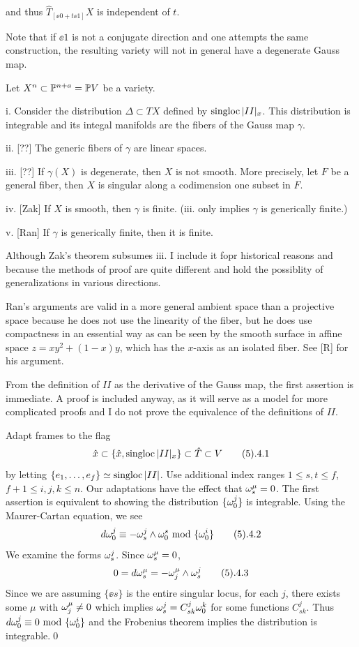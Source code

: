 and thus $\hat T_{[\ee 0 + t\ee 1]}X$ is independent of $t$.

Note that if $\ee 1$ is not a conjugate direction and one attempts
the same construction, the resulting variety will not in general
have a degenerate Gauss map.
 
 
Let $X^n\subset\Bbb P^{n+a}=\Bbb P V$ be a
variety.


i. Consider the distribution 
$\Delta\subset TX$ defined by $\text{singloc}\,| II |_x$.
This distribution is integrable and its integal manifolds
are the fibers of the Gauss map $\gamma$. 

ii. [??] The generic fibers of $\gamma$ are linear spaces.
 
iii. 
[??]
If $\gamma (X)$ is degenerate, then
$X$ is not smooth. More precisely, let $F$ be a general fiber,
then $X$ is singular along a codimension one subset in $F$.

iv. [Zak] If $X$ is smooth, then $\gamma$ is finite.
(iii. only implies $\gamma$ is generically finite.)

 
v. [Ran] If $\gamma$ is generically finite, then it is finite.
\endproclaim

Although Zak's theorem subsumes iii.   I include it
fopr historical reasons and 
  because the methods of proof are quite different and hold
the possiblity of generalizations in various directions.

 
Ran's arguments are valid in a more general ambient space
than a projective space because he
does not use the linearity of the fiber, but he does
use compactness in an essential way as can be seen by
the  smooth surface in affine space $z= xy^2+ (1-x)y$,
which has the $x$-axis as an isolated fiber.
See [R] for his argument.
$$
\ 
$$


 

 From the definition of $II$ as the derivative of the 
Gauss map, the first   assertion is   immediate. A proof
is included anyway, as it  will serve as a model
for more complicated proofs and I do not prove the equivalence of the
definitions of $II$.

Adapt frames   to the flag
$$
\hat x\subset \{ \hat x , \tsingloc
\ii_x\}\subset\hat T\subset V \tag 5.4.1
$$
by letting $\{e_{1}, \hdots ,e_{f}\}\simeq \text{singloc}\,| II |$.
Use additional index ranges $1\leq s,t\leq f$,
$f+1\leq i,j,k\leq n$.
Our adaptations have the effect that $\omega^{\mu}_{s}=0$.
The first assertion is equivalent to showing the distribution
$\{\omega^{j}_0\}$ is integrable. Using the Maurer-Cartan equation,
we see 
$$
d\oo j\equiv -\ooo js\ww\oo s \tmod \{\oo i\} \tag 5.4.2
$$
We   examine the forms $\omega^{j}_{s}$. Since $\omega^{\mu}_{s}=0$,
$$
0=d\ooo\mu s = -\ooo\mu j\ww\ooo js\tag 5.4.3
$$
Since we are assuming $\{\ee s\}$ is the entire singular locus,
for each $j$, there exists some $\mu$ with $\omega^{\mu}_{j}\neq 0$
which implies
  $\omega^{j}_{s} = C^j_{sk}\omega^{k}_0$ for some functions $C^j_{sk}$.
Thus $d\omega^{j}_0\equiv 0 \text{ mod } \{\omega^{i}_0\}$ and the Frobenius theorem
implies the distribution is   integrable.\qed\enddemo

